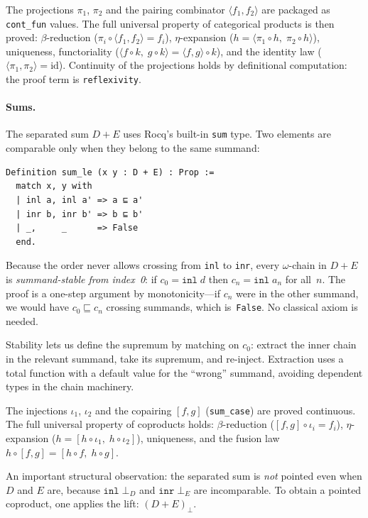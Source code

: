 The projections $\pi_1$, $\pi_2$ and the pairing combinator
$\langle f_1, f_2 \rangle$ are packaged as \texttt{cont\_fun} values.
The full universal property of categorical products is then proved:
$\beta$-reduction ($\pi_i \circ \langle f_1, f_2 \rangle = f_i$),
$\eta$-expansion ($h = \langle \pi_1 \circ h,\; \pi_2 \circ h \rangle$),
uniqueness, functoriality ($\langle f \circ k,\; g \circ k \rangle
= \langle f, g \rangle \circ k$), and the identity law
($\langle \pi_1, \pi_2 \rangle = \mathrm{id}$).
Continuity of the projections holds by definitional computation: the
proof term is \texttt{reflexivity}.

\paragraph{Sums.}
The separated sum $D + E$ uses Rocq's built-in \texttt{sum} type.
Two elements are comparable only when they belong to the same summand:
\begin{lstlisting}[caption={The separated sum order.},
                    label={lst:sumle}]
Definition sum_le (x y : D + E) : Prop :=
  match x, y with
  | inl a, inl a' => a ⊑ a'
  | inr b, inr b' => b ⊑ b'
  | _,     _      => False
  end.
\end{lstlisting}

\noindent
Because the order never allows crossing from \texttt{inl} to
\texttt{inr}, every $\omega$-chain in $D + E$ is
\emph{summand-stable from index~0}: if $c_0 = \texttt{inl}\;d$ then
$c_n = \texttt{inl}\;a_n$ for all~$n$.  The proof is a one-step
argument by monotonicity---if $c_n$ were in the other summand, we would
have $c_0 \sqsubseteq c_n$ crossing summands, which is~\texttt{False}.
No classical axiom is needed.

Stability lets us define the supremum by matching on $c_0$: extract the
inner chain in the relevant summand, take its supremum, and re-inject.
Extraction uses a total function with a default value for the
``wrong'' summand, avoiding dependent types in the chain machinery.

The injections $\iota_1$, $\iota_2$ and the copairing
$[f, g]$ (\texttt{sum\_case}) are proved continuous.  The full universal
property of coproducts holds:
$\beta$-reduction ($[f, g] \circ \iota_i = f_i$),
$\eta$-expansion ($h = [h \circ \iota_1,\; h \circ \iota_2]$),
uniqueness, and the fusion law
$h \circ [f, g] = [h \circ f,\; h \circ g]$.

An important structural observation: the separated sum is \emph{not}
pointed even when $D$ and $E$ are, because
$\texttt{inl}\;\bot_D$ and $\texttt{inr}\;\bot_E$ are incomparable.
To obtain a pointed coproduct, one applies the lift: $(D + E)_\bot$.


